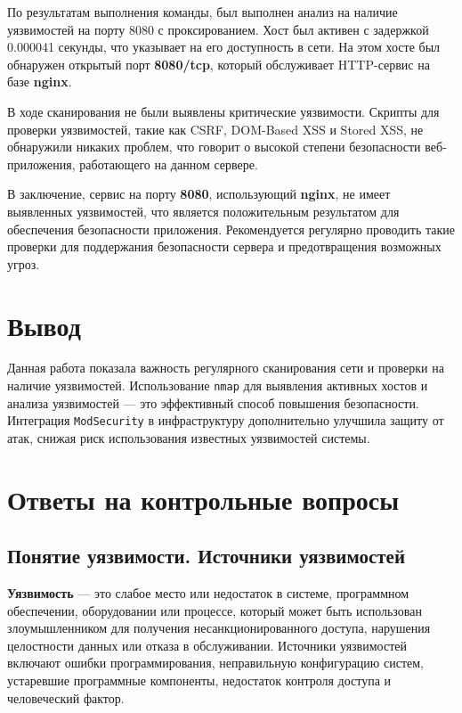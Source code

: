 По результатам выполнения команды,
был выполнен анализ на наличие уязвимостей на порту 8080 с проксированием.
Хост был активен с задержкой 0.000041 секунды,
что указывает на его доступность в сети.
На этом хосте был обнаружен открытый порт \textbf{8080/tcp},
который обслуживает HTTP-сервис на базе \textbf{nginx}.\par
В ходе сканирования не были выявлены критические уязвимости.
Скрипты для проверки уязвимостей,
такие как CSRF, DOM-Based XSS и Stored XSS, не обнаружили никаких проблем,
что говорит о высокой степени безопасности веб-приложения,
работающего на данном сервере. \par
В заключение, сервис на порту \textbf{8080}, использующий \textbf{nginx},
не имеет выявленных уязвимостей,
что является положительным результатом для обеспечения безопасности приложения.
Рекомендуется регулярно проводить такие проверки
для поддержания безопасности сервера и предотвращения возможных угроз.

\clearpage

\section*{Вывод}

Данная работа показала важность регулярного сканирования сети
и проверки на наличие уязвимостей.
Использование \texttt{nmap} для выявления активных хостов
и анализа уязвимостей --- это эффективный способ повышения безопасности.
Интеграция \texttt{ModSecurity}
в инфраструктуру дополнительно улучшила защиту от атак,
снижая риск использования известных уязвимостей системы.

\clearpage

\section*{Ответы на контрольные вопросы}

\subsection*{Понятие уязвимости. Источники уязвимостей}

\textbf{Уязвимость} --- это слабое место или недостаток в системе,
программном обеспечении, оборудовании или процессе,
который может быть использован злоумышленником
для получения несанкционированного доступа,
нарушения целостности данных или отказа в обслуживании.
Источники уязвимостей включают ошибки программирования,
неправильную конфигурацию систем, устаревшие программные компоненты,
недостаток контроля доступа и человеческий фактор.

